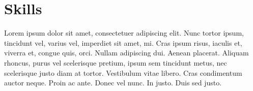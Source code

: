 \section{Skills}

Lorem ipsum dolor sit amet, consectetuer adipiscing elit. Nunc tortor ipsum, tincidunt vel, varius vel, imperdiet sit amet, mi. Cras ipsum risus, iaculis et, viverra et, congue quis, orci. Nullam adipiscing dui. Aenean placerat. Aliquam rhoncus, purus vel scelerisque pretium, ipsum sem tincidunt metus, nec scelerisque justo diam at tortor. Vestibulum vitae libero. Cras condimentum auctor neque. Proin ac ante. Donec vel nunc. In justo. Duis sed justo.

